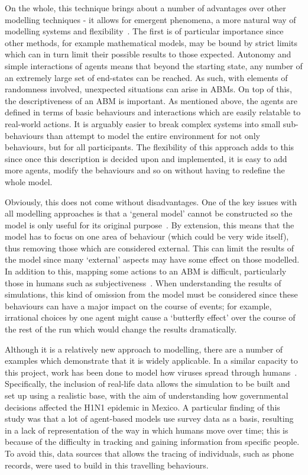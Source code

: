 \documentclass[]{report}
\begin{document}
On the whole, this technique brings about a number of advantages over other modelling techniques - it allows for emergent phenomena, a more natural way of modelling systems and flexibility~\cite{ABMMethTech}. The first is of particular importance since other methods, for example mathematical models, may be bound by strict limits which can in turn limit their possible results to those expected. Autonomy and simple interactions of agents means that beyond the starting state, any number of an extremely large set of end-states can be reached. As such, with elements of randomness involved, unexpected situations can arise in ABMs. On top of this, the descriptiveness of an ABM is important. As mentioned above, the agents are defined in terms of basic behaviours and interactions which are easily relatable to real-world actions. It is arguably easier to break complex systems into small sub-behaviours than attempt to model the entire environment for not only behaviours, but for all participants. The flexibility of this approach adds to this since once this description is decided upon and implemented, it is easy to add more agents, modify the behaviours and so on without having to redefine the whole model.

Obviously, this does not come without disadvantages. One of the key issues with all modelling approaches is that a `general model' cannot be constructed so the model is only useful for its original purpose~\cite{UCL-ABM}. By extension, this means that the model has to focus on one area of behaviour (which could be very wide itself), thus removing those which are considered external. This can limit the results of the model since many `external' aspects may have some effect on those modelled. In addition to this, mapping some actions to an ABM is difficult, particularly those in humans such as subjectiveness~\cite{ABMMethTech}. When understanding the results of simulations, this kind of omission from the model must be considered since these behaviours can have a major impact on the course of events; for example, irrational choices by one agent might cause a `butterfly effect' over the course of the rest of the run which would change the results dramatically.

Although it is a relatively new approach to modelling, there are a number of examples which demonstrate that it is widely applicable. In a similar capacity to this project, work has been done to model how viruses spread through humans~\cite{ABM-IEEE}. Specifically, the inclusion of real-life data allows the simulation to be built and set up using a realistic base, with the aim of understanding how governmental decisions affected the H1N1 epidemic in Mexico. A particular finding of this study was that a lot of agent-based models use survey data as a basis, resulting in a lack of representation of the way in which humans move over time; this is because of the difficulty in tracking and gaining information from specific people. To avoid this, data sources that allows the tracing of individuals, such as phone records, were used to build in this travelling behaviours.
\end{document}
